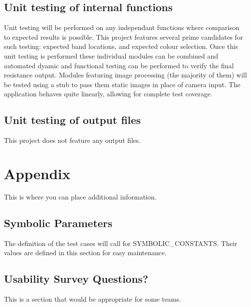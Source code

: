 \documentclass[12pt, titlepage]{article}
\begin{document}
\subsection{Unit testing of internal functions}
\par Unit testing will be performed on any independant functions where comparison to expected results is possible. This project features several prime candidates for such testing: expected band locations, and expected colour selection. Once this unit testing is performed these individual modules can be combined and automated dyamic and functional testing can be performed to verify the final resistance output. Modules featuring image processing (the majority of them) will be tested using a stub to pass them static images in place of camera input. The application behaves quite linearly, allowing for complete test coverage.
\subsection{Unit testing of output files}		
\par This project does not feature any output files.


\newpage
\section{Appendix}
This is where you can place additional information.
\subsection{Symbolic Parameters}
The definition of the test cases will call for SYMBOLIC\_CONSTANTS.
Their values are defined in this section for easy maintenance.
\subsection{Usability Survey Questions?}
This is a section that would be appropriate for some teams.
\end{document}
